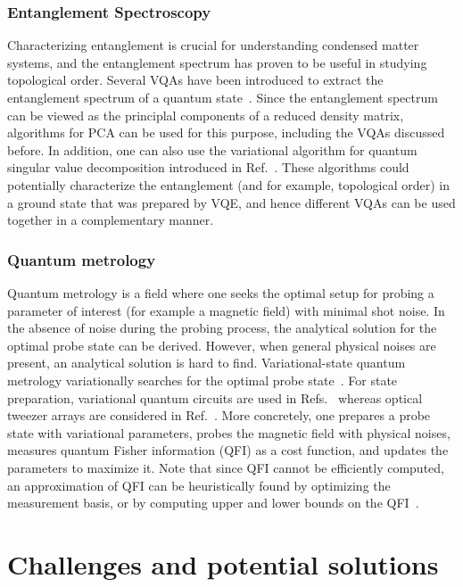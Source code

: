 \documentclass[prx,twocolumn,floatfix,superscriptaddress,longbibliography]{revtex4-1}
\newcommand{\<}{\langle}
\renewcommand{\>}{\rangle}
\begin{document}
\subsubsection{ Entanglement Spectroscopy} Characterizing entanglement is crucial for understanding condensed matter systems, and the entanglement spectrum has proven to be useful in studying topological order. Several VQAs have been introduced to extract the entanglement spectrum of a quantum state~\cite{QSVD,larose2019variational,cerezo2020variational}. Since the entanglement spectrum can be viewed as the principlal components of a reduced density matrix, algorithms for PCA can be used for this purpose, including the VQAs discussed before. In addition, one can also use the variational algorithm for quantum singular value decomposition  introduced  in Ref.~\cite{QSVD}. These algorithms could potentially characterize the entanglement (and for example, topological order) in a ground state that was prepared by VQE, and hence different VQAs can be used together in a complementary manner.

\subsubsection{ Quantum metrology} Quantum metrology is a field where one seeks the optimal setup for probing a parameter of interest (for example a magnetic field) with minimal shot noise. In the absence of noise during the probing process, the analytical solution for the optimal probe state can be derived. However, when general physical noises are present, an analytical solution is hard to find. Variational-state quantum metrology variationally searches for the optimal probe state~\cite{koczor2019variational,kaubruegger2019variational,ma2020adaptive,beckey2020variational}. For state preparation, variational quantum circuits are used in Refs.~\cite{koczor2019variational,ma2020adaptive,beckey2020variational} whereas optical tweezer arrays are considered in Ref.~\cite{kaubruegger2019variational}. More concretely, one prepares a probe state with variational parameters, probes the magnetic field with physical noises, measures quantum Fisher information (QFI) as a cost function, and updates the parameters to maximize it. Note that since QFI cannot be efficiently computed, an approximation of QFI can be heuristically found by optimizing the measurement basis, or by computing upper and lower bounds on the QFI~\cite{beckey2020variational}. 

\section{ Challenges and potential solutions}\label{sec:4}
\end{document}

